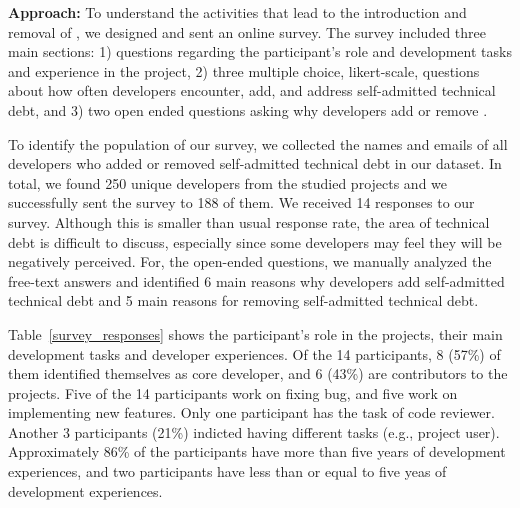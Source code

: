  
\noindent \textbf{Approach:} 
To understand the activities that lead to the introduction and removal of \SATD, we designed and sent an online survey. The survey included three main sections: 1)  questions regarding the participant's role and development tasks and experience in the project, 2) three multiple choice, likert-scale, questions about how often developers encounter, add, and address self-admitted technical debt, and 3) two open ended questions asking why developers add or remove \SATD. 

To identify the population of our survey, we collected the names and emails of all developers who added or removed self-admitted technical debt in our dataset. In total, we found 250 unique developers from the studied projects and we successfully sent the survey to 188 of them.  We received 14 responses to our survey. Although this is smaller than usual response rate, the area of technical debt is difficult to discuss, especially since some developers may feel they will be negatively perceived. For, the open-ended questions, we manually analyzed the free-text answers and identified 6 main reasons why developers add self-admitted technical debt and 5 main reasons for removing self-admitted technical debt.

Table~\ref{survey_responses} shows the participant's role in the projects, their main development tasks and developer experiences. Of the 14 participants, 8 (57\%) of them identified themselves as core developer, and 6 (43\%) are contributors to the projects. Five of the 14 participants work on fixing bug, and five work on implementing new features. Only one participant has the task of code reviewer. Another 3 participants (21\%) indicted having different tasks (e.g., project user). Approximately 86\% of the participants have more than five years of development experiences, and two participants have less than or equal to five yeas of development experiences.



